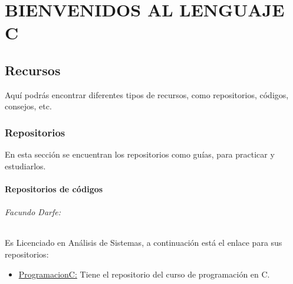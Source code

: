 \part[INTRODUCCIÓN]{BIENVENIDOS AL LENGUAJE C}

\chapter[Recursos]{Recursos}
	\raggedright
	Aquí podrás encontrar diferentes tipos de recursos, como repositorios, códigos, consejos, etc.
\section [Repositorios]{Repositorios}
	\raggedright
	En esta sección se encuentran los repositorios como guías, para practicar y estudiarlos.
\subsection[Códigos]{Repositorios de códigos}
	\paragraph[Facundo Darfe]{Facundo Darfe:}
		Es Licenciado en Análisis de Sistemas, a continuación está el enlace para sus repositorios:
			\begin{itemize}
				\item \href {https://github.com/facudarfe/ProgramacionC}{ProgramacionC:} \label{url:Facudarfe/ProgramacionC} Tiene el repositorio del curso de programación en C.
			\end{itemize}
